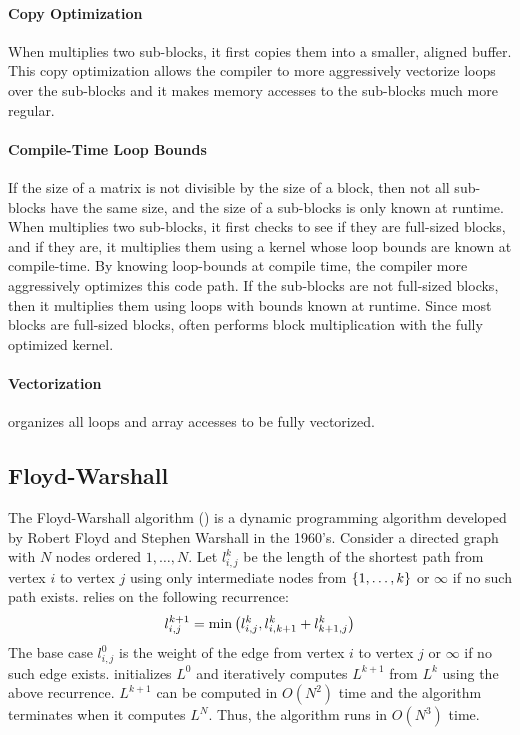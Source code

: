 \paragraph{Copy Optimization}
When \block{} multiplies two sub-blocks, it first copies them into a smaller,
aligned buffer. This copy optimization allows the compiler to more aggressively
vectorize loops over the sub-blocks and it makes memory accesses to the
sub-blocks much more regular.

\paragraph{Compile-Time Loop Bounds}
If the size of a matrix is not divisible by the size of a block, then not all
sub-blocks have the same size, and the size of a sub-blocks is only known
at runtime. When \block{} multiplies two sub-blocks, it first checks to see if
they are full-sized blocks, and if they are, it multiplies them using a kernel
whose loop bounds are known at compile-time. By knowing loop-bounds at compile
time, the compiler more aggressively optimizes this code path.  If the
sub-blocks are not full-sized blocks, then it multiplies them using loops with
bounds known at runtime. Since most blocks are full-sized blocks, \block{}
often performs block multiplication with the fully optimized kernel.

\paragraph{Vectorization}
\block{} organizes all loops and array accesses to be fully vectorized.

\subsection{Floyd-Warshall}
The Floyd-Warshall algorithm (\fw{}) is a dynamic programming algorithm
developed by Robert Floyd and Stephen Warshall in the 1960's. Consider a
directed graph  with $N$ nodes ordered $1, \ldots, N$. Let $l_{i,j}^k$ be the
length of the shortest path from vertex $i$ to vertex $j$ using only
intermediate nodes from $\left\{{1, \ldots, k}\right\}$ or $\infty$ if no such path
exists. \fw{} relies on the following recurrence:
\[
  l_{i,j}^{k+1} = \min \left({l_{i,j}^k, l_{i,k+1}^k + l_{k+1,j}^k}\right)
\]
The base case $l_{i,j}^0$ is the weight of the edge from vertex $i$ to vertex
$j$ or $\infty$ if no such edge exists. \fw{} initializes $L^0$ and
iteratively computes $L^{k+1}$ from $L^{k}$ using the above recurrence.
$L^{k+1}$ can be computed in $O(N^2)$ time and the algorithm terminates when it
computes $L^N$. Thus, the algorithm runs in $O(N^3)$ time.
